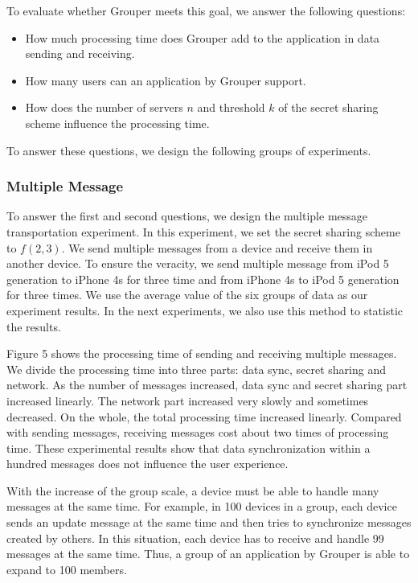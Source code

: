 \documentclass[twocolumn,10pt]{article}
\begin{document}
To evaluate whether Grouper meets this goal, we answer the following questions:

\begin{itemize}
	\setlength{\itemsep}{1pt}
	\setlength{\parskip}{0pt}
	\setlength{\parsep}{0pt}
	\item How much processing time does Grouper add to the application in data sending and receiving.
	\item How many users can an application by Grouper support.
	\item How does the number of servers $n$ and threshold ${k}$ of the secret sharing scheme influence the processing time.
\end{itemize}

To answer these questions, we design the following groups of experiments.

\subsubsection{Multiple Message}

To answer the first and second questions, we design the multiple message transportation experiment.
In this experiment, we set the secret sharing scheme to ${f(2, 3)}$.
We send multiple messages from a device and receive them in another device. 
To ensure the veracity, we send multiple message from iPod 5 generation to iPhone 4s for three time and from iPhone 4s to iPod 5 generation for three times.
We use the average value of the six groups of data as our experiment results.
In the next experiments, we also use this method to statistic the results.

Figure 5 shows the processing time of sending and receiving multiple messages.
We divide the processing time into three parts: data sync, secret sharing and network.
As the number of messages increased, data sync and secret sharing part increased linearly. 
The network part increased very slowly and sometimes decreased.
On the whole, the total processing time increased linearly.
Compared with sending messages, receiving messages cost about two times of processing time.
These experimental results show that data synchronization within a hundred messages does not influence the user experience.

With the increase of the group scale, a device must be able to handle many messages at the same time.
For example, in 100 devices in a group, each device sends an update message at the same time and then tries to synchronize messages created by others.
In this situation, each device has to receive and handle 99 messages at the same time.
Thus, a group of an application by Grouper is able to expand to 100 members.
\end{document}
